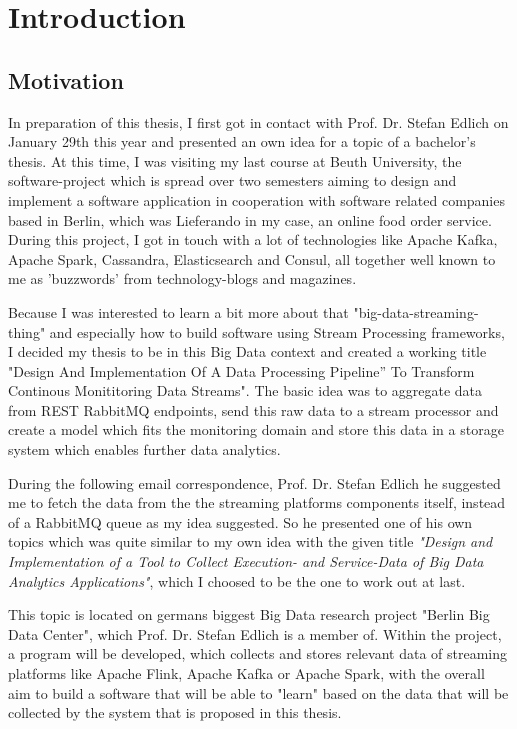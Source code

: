 \chapter{Introduction}
\section{Motivation}
In preparation of this thesis, I first got in contact with Prof. Dr. Stefan Edlich on January
29th this year and presented an own idea for a topic of a bachelor's thesis. At this time,
I was visiting my last course at Beuth University, the software-project which is spread
over two semesters aiming to design and implement a software application in cooperation
with software related companies based in Berlin, which was Lieferando in my case, an
online food order service. During this project, I got in touch with a lot of technologies
like Apache Kafka, Apache Spark, Cassandra, Elasticsearch and Consul, all together well
known to me as 'buzzwords' from technology-blogs and magazines.

Because I was interested to learn a bit more about that "big-data-streaming-thing" and
especially how to build software using Stream Processing frameworks, I decided my thesis
to be in this Big Data context and created a working title "Design And Implementation Of
A Data Processing Pipeline” To Transform Continous Monititoring Data Streams". The
basic idea was to aggregate data from REST RabbitMQ endpoints, send this raw data
to a stream processor and create a model which fits the monitoring domain and store this
data in a storage system which enables further data analytics.

During the following email correspondence, Prof. Dr. Stefan Edlich he suggested me to
fetch the data from the the streaming platforms components itself, instead of a RabbitMQ
queue as my idea suggested. So he presented one of his own topics which was quite
similar to my own idea with the given title \textit{"Design and Implementation of a Tool to
Collect Execution- and Service-Data of Big Data Analytics Applications"}, which I choosed to
be the one to work out at last.

This topic is located on germans biggest Big Data research project "Berlin Big Data Center",
which Prof. Dr. Stefan Edlich is a member of. Within the project, a program will be
developed, which collects and stores relevant data of streaming platforms like Apache
Flink, Apache Kafka or Apache Spark, with the overall aim to build a software that will be
able to "learn" based on the data that will be collected by the system that is proposed in
this thesis.

